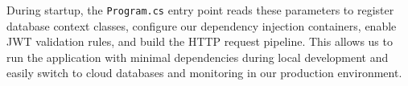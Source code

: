 During startup, the \texttt{Program.cs} entry point reads these parameters to register database context classes, configure our dependency injection containers, enable JWT validation rules, and build the HTTP request pipeline. This allows us to run the application with minimal dependencies during local development and easily switch to cloud databases and monitoring in our production environment.
